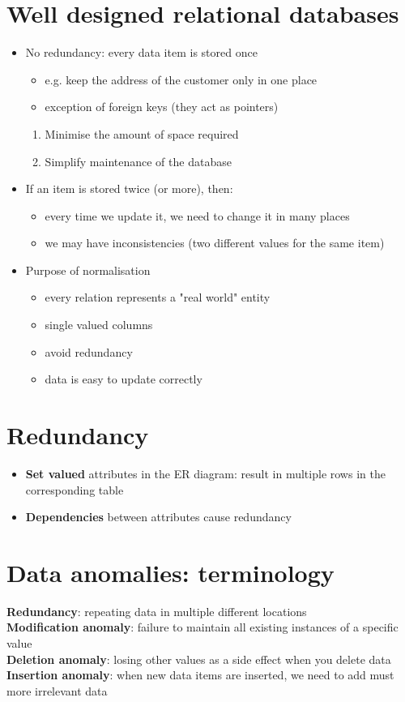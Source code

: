\documentclass{article}[18pt]
\begin{document}
\section{Well designed relational databases}
\begin{itemize}
	\item No redundancy: every data item is stored once
	\begin{itemize}
		\item e.g. keep the address of the customer only in one place
		\item exception of foreign keys (they act as pointers)
	\end{itemize}
	\begin{enumerate}
		\item Minimise the amount of space required
		\item Simplify maintenance of the database
	\end{enumerate}
	\item If an item is stored twice (or more), then:
	\begin{itemize}
		\item every time we update it, we need to change it in many places
		\item we may have inconsistencies (two different values for the same item)
	\end{itemize}
	\item Purpose of normalisation
	\begin{itemize}
		\item every relation represents a "real world" entity
		\item single valued columns
		\item avoid redundancy
		\item data is easy to update correctly
	\end{itemize}
\end{itemize}
\section{Redundancy}
\begin{itemize}
	\item \textbf{Set valued} attributes in the ER diagram: result in multiple rows in the corresponding table
	\item \textbf{Dependencies} between attributes cause redundancy
\end{itemize}
\section{Data anomalies: terminology}
\textbf{Redundancy}: repeating data in multiple different locations\\
\textbf{Modification anomaly}: failure to maintain all existing instances of a specific value\\
\textbf{Deletion anomaly}: losing other values as a side effect when you delete data\\
\textbf{Insertion anomaly}: when new data items are inserted, we need to add must more irrelevant data
\end{document}
